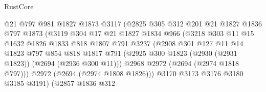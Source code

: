 \begin{lexlean}{RustCore}
\begin{coremodule}
                              @21
                              @797
                              @981
                              @1827
                              @1873
                              @3117
                              (@2825
                                @305
                                @312
                                @201
                                @21
                                @1827
                                @1836
                                @797
                                @1873
                                (@3119
                                  @304
                                  @17
                                  @21
                                  @1827
                                  @1834
                                  @966
                                  (@3218
                                    @303
                                    @11
                                    @15
                                    @1632
                                    @1826
                                    @1833
                                    @818
                                    @1807
                                    @791
                                    @3237
                                    (@2908
                                      @301
                                      @127
                                      @11
                                      @14
                                      @1823
                                      @797
                                      @854
                                      @818
                                      @1817
                                      @791
                                      (@2925
                                        @300
                                        @1823
                                        (@2930 (@2931 @1823))
                                        (@2694 (@2936 @300 @11)))
                                      @2968
                                      @2972
                                      (@2694 (@2974 @1818 @797)))
                                    @2972
                                    (@2694 (@2974 @1808 @1826)))
                                  @3170
                                  @3173
                                  @3176
                                  @3180
                                  @3185
                                  @3191)
                                (@2857
                                  @1836
                                  @312

\end{coremodule}
\end{lexlean}
